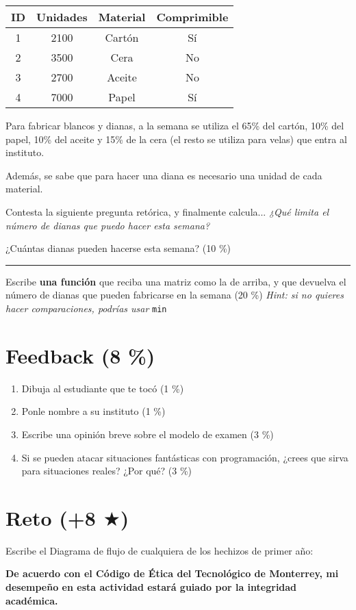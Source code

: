 \documentclass[11pt, onside]{article}
\newcommand{\matlab}[1]{\lstinline[style=Matlab-editor]!#1!}
\newcommand{\shortresponserule}{{\large\rule{5 cm}{0.3mm}}}
\begin{document}
\begin{table}[htbp]
    \centering
    \begin{tabular}{@{}cccc@{}}
    \toprule
    \textbf{ID} & \textbf{Unidades} & \textbf{Material} & \textbf{Comprimible} \\ \midrule
    1 & 2100 & Cartón & Sí \\
    2 & 3500 & Cera & No \\
    3 & 2700 & Aceite & No \\
    4 & 7000 & Papel & Sí \\ \bottomrule
    \end{tabular}
\end{table}

Para fabricar blancos y dianas, a la semana se utiliza el 65\% del cartón, 10\% del papel, 10\% del aceite y 15\% de la cera (el resto se utiliza para velas) que entra al instituto.

Además, se sabe que para hacer una diana es necesario una unidad de cada material.

Contesta la siguiente pregunta retórica, y finalmente calcula...
\textit{¿Qué limita el número de dianas que puedo hacer esta semana?}

¿Cuántas dianas pueden hacerse esta semana? (10 \%) \shortresponserule

\bigskip

Escribe \textbf{una función} que reciba una matriz como la de arriba, y que devuelva el número de dianas que pueden fabricarse en la semana (20 \%)
\textit{Hint: si no quieres hacer comparaciones, podrías usar} \matlab{min}

\section{Feedback (8 \%)}

\begin{enumerate}[label=\alph*)]
    \item Dibuja al estudiante que te tocó (1 \%)
    \item Ponle nombre a su instituto (1 \%)
    \item Escribe una opinión breve sobre el modelo de examen (3 \%)
    \item Si se pueden atacar situaciones fantásticas con programación, ¿crees que sirva para situaciones reales? ¿Por qué? (3 \%)
\end{enumerate}

\section{Reto (+8 $\bigstar$)}

Escribe el Diagrama de flujo de cualquiera de los hechizos de primer año:

\vfill

\textbf{De acuerdo con el Código de Ética del Tecnológico de Monterrey, mi desempeño en esta actividad estará guiado por la integridad académica.}
\end{document}
